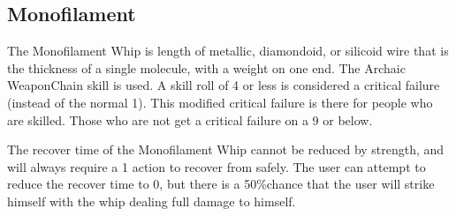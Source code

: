 \documentclass[twoside]{book}
\begin{document}
\begin{multicols}{2}
    


\hspace{-2ex}
\vspace{1ex}


    


\hspace{-2ex}
\vspace{1ex}


    


\hspace{-2ex}
\vspace{1ex}


    
\end{multicols}
  
    

\subsection{Monofilament}
    
    {  
    The Monofilament Whip is length of metallic, diamondoid, or silicoid wire that is the thickness of a single molecule, with a weight on one end. The Archaic WeaponChain skill is used. A skill roll of 4 or less is considered a critical failure (instead of the normal 1). This modified critical failure is there for people who are skilled. Those who are not get a critical failure on a 9 or below.
    }
  
    {  
    The recover time of the Monofilament Whip cannot be reduced by strength, and will always require a 1 action to recover from safely. The user can attempt to reduce the recover time to 0, but there is a 50\%chance that the user will strike himself with the whip dealing full damage to himself.
    }
  
\end{document}
